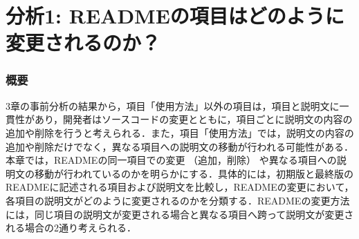 \documentclass[submit]{ipsj}
\begin{document}




\begin{table}[t]
 \centering
 \caption{項目「使用方法」の予測結果}
\label{tab:result}
\end{table}




\section{分析1: READMEの項目はどのように変更されるのか？}
\subsubsection{概要}
3章の事前分析の結果から，項目「使用方法」以外の項目は，項目と説明文に一貫性があり，開発者はソースコードの変更とともに，項目ごとに説明文の内容の追加や削除を行うと考えられる．また，項目「使用方法」では，説明文の内容の追加や削除だけでなく，異なる項目への説明文の移動が行われる可能性がある．本章では，READMEの同一項目での変更 （追加，削除） や異なる項目への説明文の移動が行われているのかを明らかにする．具体的には，初期版と最終版のREADMEに記述される項目および説明文を比較し，READMEの変更において，各項目の説明文がどのように変更されるのかを分類する．READMEの変更方法には，同じ項目の説明文が変更される場合と異なる項目へ跨って説明文が変更される場合の2通り考えられる．
\end{document}
